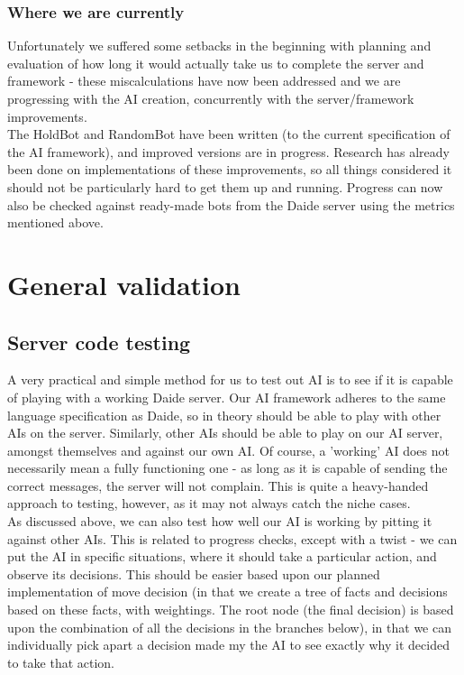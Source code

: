 \documentclass[11pt]{article}
\begin{document}
\subsubsection{Where we are currently}
Unfortunately we suffered some setbacks in the beginning with planning and 
evaluation of how long it would actually take us to complete the server and
framework - these miscalculations have now been addressed and we are progressing
with the AI creation, concurrently with the server/framework improvements. 
\\
The HoldBot and RandomBot have been written (to the current specification of the
AI framework), and improved versions are in progress. Research has already been 
done on implementations of these improvements, so all things considered it
should not be particularly hard to get them up and running. Progress can now 
also be checked against ready-made bots from the Daide server using the metrics
mentioned above.

\section{General validation}

\subsection{Server code testing}
A very practical and simple method for us to test out AI is to see if it is 
capable of playing with a working Daide server. Our AI framework adheres to the
same language specification as Daide, so in theory should be able to play with
other AIs on the server. Similarly, other AIs should be able to play on our AI
server, amongst themselves and against our own AI. Of course, a 'working' AI 
does not necessarily mean a fully functioning one - as long as it is capable of
sending the correct messages, the server will not complain. This is quite a 
heavy-handed approach to testing, however, as it may not always catch the niche
cases.
\\
As discussed above, we can also test how well our AI is working by pitting it
against other AIs. This is related to progress checks, except with a twist - we
can put the AI in specific situations, where it should take a particular action,
and observe its decisions. This should be easier based upon our planned 
implementation of move decision (in that we create a tree of facts and decisions
based on these facts, with weightings. The root node (the final decision) is 
based upon the combination of all the decisions in the branches below), in that
we can individually pick apart a decision made my the AI to see exactly why it
decided to take that action.
\end{document}
